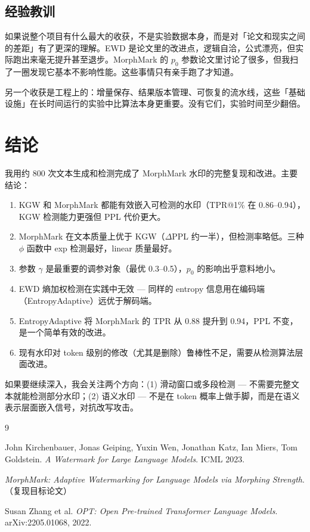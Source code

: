 \documentclass[11pt,a4paper]{article}
\begin{document}
\subsection{经验教训}

如果说整个项目有什么最大的收获，不是实验数据本身，而是对「论文和现实之间的差距」有了更深的理解。EWD 是论文里的改进点，逻辑自洽，公式漂亮，但实际跑出来毫无提升甚至退步。MorphMark 的 $p_0$ 参数论文里讨论了很多，但我扫了一圈发现它基本不影响性能。这些事情只有亲手跑了才知道。

另一个收获是工程上的：增量保存、结果版本管理、可恢复的流水线，这些「基础设施」在长时间运行的实验中比算法本身更重要。没有它们，实验时间至少翻倍。

\section{结论}

我用约 800 次文本生成和检测完成了 MorphMark 水印的完整复现和改进。主要结论：

\begin{enumerate}[nosep]
  \item KGW 和 MorphMark 都能有效嵌入可检测的水印（TPR@1\% 在 0.86--0.94），KGW 检测能力更强但 PPL 代价更大。
  \item MorphMark 在文本质量上优于 KGW（$\Delta$PPL 约一半），但检测率略低。三种 $\phi$ 函数中 exp 检测最好，linear 质量最好。
  \item 参数 $\gamma$ 是最重要的调参对象（最优 0.3--0.5），$p_0$ 的影响出乎意料地小。
  \item EWD 熵加权检测在实践中无效 — 同样的 entropy 信息用在编码端（EntropyAdaptive）远优于解码端。
  \item EntropyAdaptive 将 MorphMark 的 TPR 从 0.88 提升到 0.94，PPL 不变，是一个简单有效的改进。
  \item 现有水印对 token 级别的修改（尤其是删除）鲁棒性不足，需要从检测算法层面改进。
\end{enumerate}

如果要继续深入，我会关注两个方向：(1) 滑动窗口或多段检测 — 不需要完整文本就能检测部分水印；(2) 语义水印 — 不是在 token 概率上做手脚，而是在语义表示层面嵌入信号，对抗改写攻击。

\begin{thebibliography}{9}

John Kirchenbauer, Jonas Geiping, Yuxin Wen, Jonathan Katz, Ian Miers, Tom Goldstein.
\textit{A Watermark for Large Language Models}.
ICML 2023.

\textit{MorphMark: Adaptive Watermarking for Language Models via Morphing Strength}.
（复现目标论文）

Susan Zhang et al.
\textit{OPT: Open Pre-trained Transformer Language Models}.
arXiv:2205.01068, 2022.

\end{thebibliography}
\end{document}
